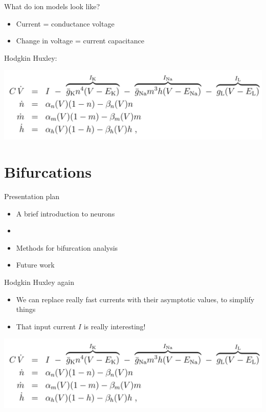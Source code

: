 \documentclass[presentation]{beamer}
\begin{document}
\begin{frame}[label={sec:org7a25403}]{What do ion models look like?}
\begin{itemize}
\item Current = conductance \texttimes{} voltage
\item Change in voltage = current \textdiv{} capacitance
\end{itemize}

\vfill
Hodgkin Huxley:
\begin{center}
\includegraphics[width=.9\linewidth]{./hh1.png}
\end{center}
\end{frame}


\section{Bifurcations}
\label{sec:orgf2c2dd4}

\begin{frame}[label={sec:orgd3733db}]{Presentation plan}
\begin{itemize}
\item A brief introduction to neurons
\item \color{bristolred}{Bifurcations as neural encodings}
\item \color{black} Methods for bifurcation analysis
\item Future work
\end{itemize}
\end{frame}

\begin{frame}[label={sec:org3369e4d}]{Hodgkin Huxley again}
\begin{itemize}
\item We can replace really fast currents with their asymptotic values, to simplify things
\item That input current \(I\) is really interesting!
\end{itemize}
\vfill
\begin{center}
\includegraphics[width=.9\linewidth]{./hh1.png}
\end{center}
\end{frame}
\end{document}
